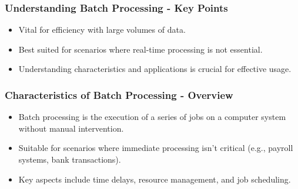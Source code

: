 \documentclass{beamer}
\begin{document}
\begin{frame}[fragile]
    \frametitle{Understanding Batch Processing - Key Points}
    \begin{itemize}
        \item Vital for efficiency with large volumes of data.
        \item Best suited for scenarios where real-time processing is not essential.
        \item Understanding characteristics and applications is crucial for effective usage.
    \end{itemize}
\end{frame}

\begin{frame}[fragile]
    \frametitle{Characteristics of Batch Processing - Overview}
    \begin{itemize}
        \item Batch processing is the execution of a series of jobs on a computer system without manual intervention.
        \item Suitable for scenarios where immediate processing isn't critical (e.g., payroll systems, bank transactions).
        \item Key aspects include time delays, resource management, and job scheduling.
    \end{itemize}
\end{frame}
\end{document}
